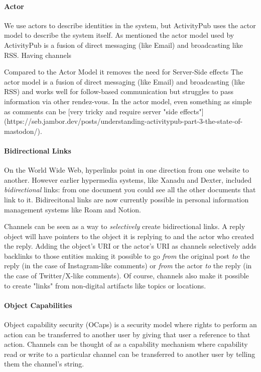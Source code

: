 \paragraph{Actor}

We use actors to describe identities in the system,
but ActivityPub uses the actor model to describe the system itself.
As mentioned the actor model used by ActivityPub is a fusion of
direct messaging (like Email) and broadcasting like RSS.
Having channels

Compared to the Actor Model it removes the need for Server-Side effects
The actor model is a fusion of direct messaging (like Email) and broadcasting
(like RSS) and works well for follow-based communication but struggles
to pass information via other rendez-vous.
In the actor model, even something as simple as comments can be
[very tricky and require server "side effects"](https://seb.jambor.dev/posts/understanding-activitypub-part-3-the-state-of-mastodon/).

\paragraph{Bidirectional Links}

On the World Wide Web, hyperlinks point in one direction from one website to another.
However earlier hypermedia systems, like Xanadu and Dexter, included \emph{bidirectional} links:
from one document you could see all the other documents that link to it.
Bidirecitonal links are now currently possible in personal information management systems like Roam and Notion.

Channels can be seen as a way to \emph{selectively} create bidirectional links.
A reply object will have pointers to the object it is replying to and the actor who created the reply.
Adding the object's URI or the actor's URI as channels selectively adds backlinks to those entities
making it possible to go \emph{from} the original post \emph{to} the reply (in the case of Instagram-like comments)
or \emph{from} the actor \emph{to} the reply (in the case of Twitter/X-like comments).
Of course, channels also make it possible to create "links" from non-digital artifacts like topics or locations.

\paragraph{Object Capabilities}

Object capability security (OCaps) is a security model where rights to perform an action
can be transferred to another user by giving that user a reference to that action.
Channels can be thought of as a capability mechanism where
capability read or write to a particular channel
can be transferred to another user by telling them the channel's string.

